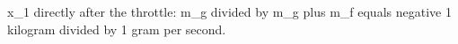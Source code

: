 x_1 directly after the throttle:  
m_g divided by m_g plus m_f equals negative 1 kilogram divided by 1 gram per second.